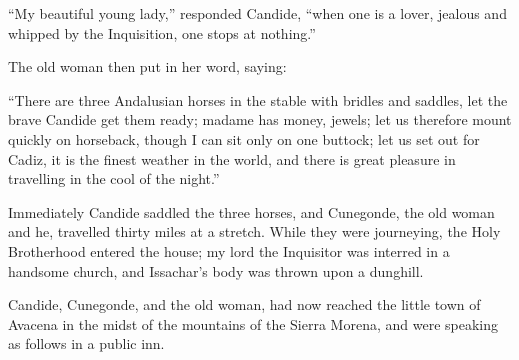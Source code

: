 ``My beautiful young lady,'' responded Candide, ``when one is a lover, jealous and whipped by the Inquisition, one stops at nothing.''

The old woman then put in her word, saying:

``There are three Andalusian horses in the stable with bridles and saddles, let the brave Candide get them ready; madame has money, jewels; let us therefore mount quickly on horseback, though I can sit only on one buttock; let us set out for Cadiz, it is the finest weather in the world, and there is great pleasure in travelling in the cool of the night.''

Immediately Candide saddled the three horses, and Cunegonde, the old woman and he, travelled thirty miles at a stretch. While they were journeying, the Holy Brotherhood entered the house; my lord the Inquisitor was interred in a handsome church, and Issachar's body was thrown upon a dunghill.

Candide, Cunegonde, and the old woman, had now reached the little town of Avacena in the midst of the mountains of the Sierra Morena, and were speaking as follows in a public inn.

